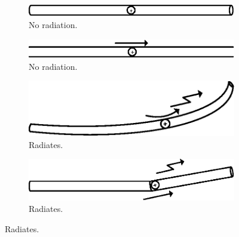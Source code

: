\begin{figure}[H]
    \centering
    \begin{subfigure}[b]{0.4\textwidth}
        \includegraphics[width=\textwidth]{img/radiations_no_movement.eps}
        \caption{No radiation.}
        \label{fig:no_move}
    \end{subfigure}
    \begin{subfigure}[b]{0.4\textwidth}
        \includegraphics[width=\textwidth]{img/radiations_infinite.eps}
        \caption{No radiation.}
        \label{fig:infinite}
    \end{subfigure}
    
    \begin{subfigure}[b]{0.4\textwidth}
        \includegraphics[width=\textwidth]{img/radiations_curved.eps}
        \caption{Radiates.}
        \label{fig:curved}
    \end{subfigure}
    \begin{subfigure}[b]{0.4\textwidth}
        \includegraphics[width=\textwidth]{img/radiations_bent.eps}
        \caption{Radiates.}
        \label{fig:bent}
    \end{subfigure}
    

\end{figure}
